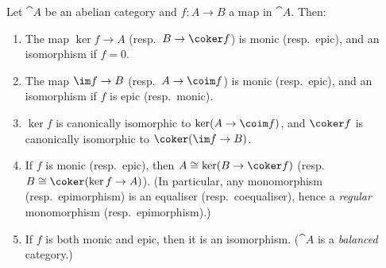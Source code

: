 \begin{lem}\label{lem:mono-epi-abelian-category}
Let \(\cat A\) be an abelian category and \(f\colon A\to B\) a map in \(\cat A\).
Then:
\begin{enumerate}
\item\label{lem:mono-epi-abelian-category:i} The map \(\ker f\to A\) (resp.~\(B\to\coker f\)) is monic (resp.~epic), and an isomorphism if \(f=0\).
\item\label{lem:mono-epi-abelian-category:ii} The map \(\im f\to B\) (resp.~\(A\to\coim f\)) is monic (resp.~epic), and an isomorphism if \(f\) is epic (resp.~monic).
\item\label{lem:mono-epi-abelian-category:iii} \(\ker f\) is canonically isomorphic to \(\ker(A\to\coim f)\), and \(\coker f\) is canonically isomorphic to \(\coker(\im f\to B)\).
\item\label{lem:mono-epi-abelian-category:iv} If \(f\) is monic (resp.~epic), then \(A\cong\ker(B\to\coker f)\) (resp.~\(B\cong\coker(\ker f\to A)\)).
  (In particular, any monomorphism (resp.~epimorphism) is an equaliser (resp.~coequaliser), hence a \emph{regular} monomorphism (resp.~epimorphism).)
\item\label{lem:mono-epi-abelian-category:v} If \(f\) is both monic and epic, then it is an isomorphism.
  (\(\cat A\) is a \emph{balanced} category.)
\end{enumerate}
\end{lem}
